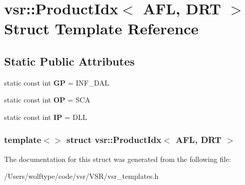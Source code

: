 \hypertarget{structvsr_1_1_product_idx_3_01_a_f_l_00_01_d_r_t_01_4}{\section{vsr\-:\-:Product\-Idx$<$ A\-F\-L, D\-R\-T $>$ Struct Template Reference}
\label{structvsr_1_1_product_idx_3_01_a_f_l_00_01_d_r_t_01_4}
}
\subsection*{Static Public Attributes}
\begin{DoxyCompactItemize}
\item 
\hypertarget{structvsr_1_1_product_idx_3_01_a_f_l_00_01_d_r_t_01_4_ae1f95f329ba88e139dac516b5e613906}{static const int {\bfseries G\-P} = I\-N\-F\-\_\-\-D\-A\-L}\label{structvsr_1_1_product_idx_3_01_a_f_l_00_01_d_r_t_01_4_ae1f95f329ba88e139dac516b5e613906}

\item 
\hypertarget{structvsr_1_1_product_idx_3_01_a_f_l_00_01_d_r_t_01_4_aa2d7d3b97aaaf9750f637fb867c60c32}{static const int {\bfseries O\-P} = S\-C\-A}\label{structvsr_1_1_product_idx_3_01_a_f_l_00_01_d_r_t_01_4_aa2d7d3b97aaaf9750f637fb867c60c32}

\item 
\hypertarget{structvsr_1_1_product_idx_3_01_a_f_l_00_01_d_r_t_01_4_ab699d373d60335cd2fe5a717368812f4}{static const int {\bfseries I\-P} = D\-L\-L}\label{structvsr_1_1_product_idx_3_01_a_f_l_00_01_d_r_t_01_4_ab699d373d60335cd2fe5a717368812f4}

\end{DoxyCompactItemize}
\subsubsection*{template$<$$>$ struct vsr\-::\-Product\-Idx$<$ A\-F\-L, D\-R\-T $>$}



The documentation for this struct was generated from the following file\-:\begin{DoxyCompactItemize}
\item 
/\-Users/wolftype/code/vsr/\-V\-S\-R/vsr\-\_\-templates.\-h\end{DoxyCompactItemize}
